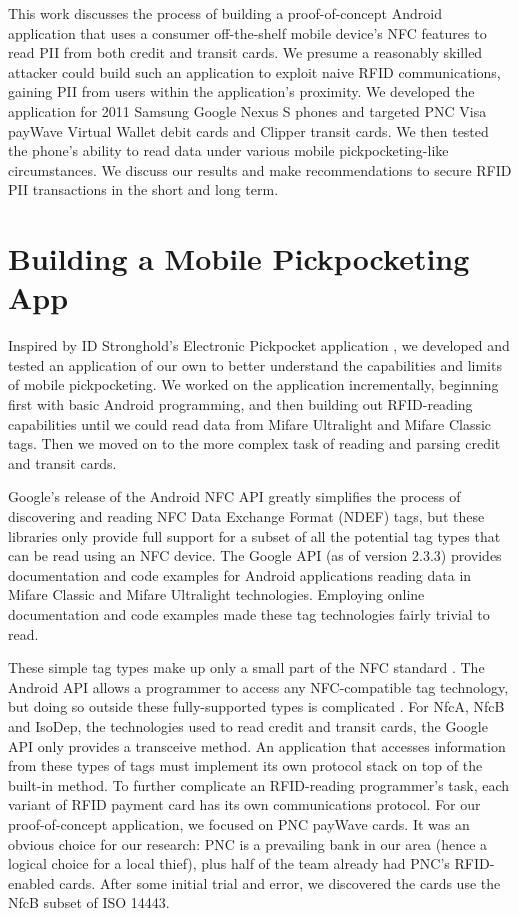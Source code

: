 \documentclass{sig-alternate}
\begin{document}
This work discusses the process of building a proof-of-concept Android application that uses a consumer off-the-shelf mobile device's NFC features to read PII from both credit and transit cards.  We presume a reasonably skilled attacker could build such an application to exploit naive RFID communications, gaining PII from users within the application's proximity.  We developed the application for 2011 Samsung Google Nexus S phones and targeted PNC Visa payWave Virtual Wallet debit cards and Clipper transit cards.  We then tested the phone's ability to read data under various mobile pickpocketing-like circumstances.  We discuss our results and make recommendations to secure RFID PII transactions in the short and long term.  

\section{Building a Mobile Pickpocketing App}
Inspired by ID Stronghold's Electronic Pickpocket application \cite{google-play-idstronghold}, we developed and tested an application of our own to better understand the capabilities and limits of mobile pickpocketing.  We worked on the application incrementally, beginning first with basic Android programming, and then building out RFID-reading capabilities until we could read data from Mifare Ultralight and Mifare Classic tags.  Then we moved on to the more complex task of reading and parsing credit and transit cards.    

Google's release of the Android NFC API greatly simplifies the process of discovering and reading NFC Data Exchange Format (NDEF) tags, but these libraries only provide full support for a subset of all the potential tag types that can be read using an NFC device. The Google API (as of version 2.3.3) provides documentation and code examples for Android applications reading data in Mifare Classic and Mifare Ultralight technologies.  Employing online documentation and code examples \cite{mifare-classic-detection-android} made these tag technologies fairly trivial to read.

These simple tag types make up only a small part of the NFC standard \cite{opennfc-1}.  The Android API allows a programmer to access any NFC-compatible tag technology, but doing so outside these fully-supported types is complicated \cite{android-developers-advanced-nfc}.  For NfcA, NfcB and IsoDep, the technologies used to read credit and transit cards, the Google API only provides a transceive method.  An application that accesses information from these types of tags must implement its own protocol stack on top of the built-in method.  To further complicate an RFID-reading programmer's task, each variant of RFID payment card has its own communications protocol.  For our proof-of-concept application, we focused on PNC payWave cards.  It was an obvious choice for our research: PNC is a prevailing bank in our area (hence a logical choice for a local thief), plus half of the team already had PNC's RFID-enabled cards.  After some initial trial and error, we discovered the cards use the NfcB subset of ISO 14443.  
\end{document}
